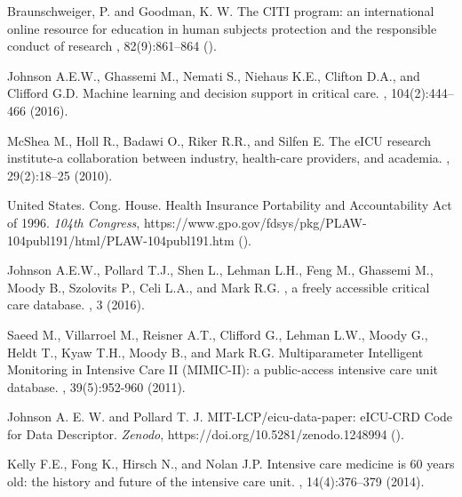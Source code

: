 \documentclass[english]{article}
\begin{document}
\begin{thebibliography}{1}
Braunschweiger, P. and Goodman, K. W.
\newblock The CITI program: an international online resource for education in human subjects protection and the responsible conduct of research
, 82(9):861--864 ().

Johnson A.E.W., Ghassemi M., Nemati S., Niehaus K.E., Clifton D.A., and Clifford G.D.
\newblock Machine learning and decision support in critical care.
, 104(2):444--466 (2016).

McShea M., Holl R., Badawi O., Riker R.R., and Silfen E.
\newblock The {eICU} research institute-a collaboration between industry, health-care providers, and academia.
, 29(2):18--25 (2010).

United States. Cong. House.
\newblock Health Insurance Portability and Accountability Act of 1996.
\newblock \emph{104th Congress}, https://www.gpo.gov/fdsys/pkg/PLAW-104publ191/html/PLAW-104publ191.htm ().

Johnson A.E.W., Pollard T.J., Shen L., Lehman L.H., Feng M., Ghassemi M., Moody B., Szolovits P., Celi L.A., and Mark R.G.
, a freely accessible critical care database.
, 3 (2016).

Saeed M., Villarroel M., Reisner A.T., Clifford G., Lehman L.W., Moody G., Heldt T., Kyaw T.H., Moody B., and Mark R.G.
\newblock Multiparameter Intelligent Monitoring in Intensive Care {II} ({MIMIC-II}): a public-access intensive care unit database. , 39(5):952-960 (2011).

Johnson A. E. W. and Pollard T. J.
\newblock MIT-LCP/eicu-data-paper: eICU-CRD Code for Data Descriptor.
\newblock \emph{Zenodo}, https://doi.org/10.5281/zenodo.1248994 ().

Kelly F.E., Fong K., Hirsch N., and Nolan J.P.
\newblock Intensive care medicine is 60 years old: the history and future of
  the intensive care unit.
, 14(4):376--379 (2014).


\end{thebibliography}
\end{document}
